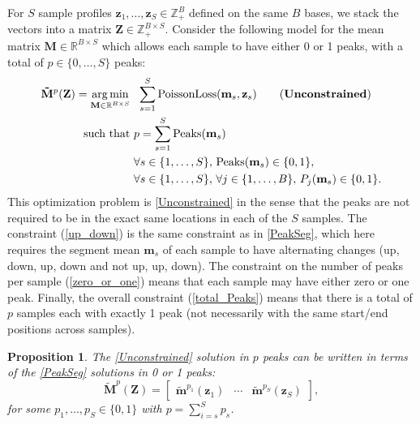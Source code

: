 \documentclass{article} %
\newtheorem{proposition}{Proposition}
\DeclareMathOperator*{\argmin}{arg\,min}
\DeclareMathOperator*{\Peaks}{Peaks}
\newcommand{\RR}{\mathbb R}
\newcommand{\ZZ}{\mathbb Z}
\begin{document}
For $S$ sample profiles $\mathbf z_1, \dots, \mathbf z_S\in\ZZ_+^B$
defined on the same $B$ bases, we stack the vectors into a matrix
$\mathbf Z\in\ZZ_+^{B \times S}$. Consider the following model for the
mean matrix $\mathbf M\in\RR^{B\times S}$ which allows each sample to
have either 0 or 1 peaks, with a total of $p\in\{0, \dots, S\}$ peaks:
\begin{align}
  \label{Unconstrained}
  \mathbf{\tilde M}^p(\mathbf Z)  =
  \argmin_{\mathbf M\in\RR^{B\times S}} &\ \ 
  \sum_{s=1}^S 
  \text{PoissonLoss}(\mathbf m_s, \mathbf z_s) 
  \tag{\textbf{Unconstrained}}
  \\
  \text{such that} &\ p = \sum_{s=1}^S \Peaks(\mathbf m_s)
  \label{total_Peaks}
  \\
  &\ \forall s\in\{1, \dots, S\},\, 
  \Peaks(\mathbf m_s)\in\{0, 1\},  
  \label{zero_or_one}
  \\
  &\ \forall s\in\{1, \dots, S\},\, 
  \forall j\in\{1, \dots, B\},\, P_j(\mathbf m_s) \in\{0, 1\}.
  \label{up_down}
\end{align}
This optimization problem is \ref{Unconstrained} in the sense that the
peaks are not required to be in the exact same locations in each of
the $S$ samples. The constraint (\ref{up_down}) is the same constraint
as in \ref{PeakSeg}, which here requires the segment mean $\mathbf
m_s$ of each sample to have alternating changes (up, down, up, down
and not up, up, down). The constraint on the number of peaks per
sample (\ref{zero_or_one}) means that each sample may have either zero
or one peak. Finally, the overall constraint (\ref{total_Peaks}) means
that there is a total of $p$ samples each with exactly 1 peak (not
necessarily with the same start/end positions across samples).

\begin{proposition}
The \ref{Unconstrained} solution in $p$ peaks
can be written in terms of the \ref{PeakSeg} solutions in 0 or 1 peaks:
\begin{equation}
  \label{eq:unconstrained_PeakSeg}
  \mathbf{\tilde M}^p(\mathbf Z) = \left[
    \begin{array}{ccc}
      \mathbf{\tilde m}^{p_1}(\mathbf z_1) & 
      \cdots &
      \mathbf{\tilde m}^{p_S}(\mathbf z_S) 
    \end{array}
  \right],
\end{equation}
for some $p_1,\dots, p_S\in\{0, 1\}$ with $p=\sum_{i=s}^S p_s$.
\end{proposition}
\end{document}

